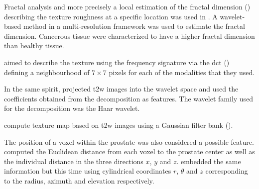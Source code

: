 \begin{enumerate}[leftmargin=*]

Fractal analysis and more precisely a local estimation of the fractal dimension (\cite{Benassi1998}) describing the texture roughness at a specific location was used in \cite{Lopes2011}. A wavelet-based method in a multi-resolution framework was used to estimate the fractal dimension. Cancerous tissue were characterized to have a higher fractal dimension than healthy tissue.

\cite{Chan2003} aimed to describe the texture using the frequency signature via the \acf{dct} (\cite{Ahmed1974}) defining a neighbourhood of $7 \times 7$ pixels for each of the modalities that they used.%
%
%

In the same spirit, \cite{Viswanath2012} projected \ac{t2w} images into the wavelet space and used the coefficients obtained from the decomposition as features. The wavelet family used for the decomposition was the Haar wavelet.

\cite{Litjens2014} compute texture map based on \ac{t2w} images using a Gaussian filter bank (\cite{Leung2001}).

The position of a voxel within the prostate was also considered a possible feature. \cite{Litjens2011,Litjens2014} computed the Euclidean distance from each voxel to the prostate center as well as the individual distance in the three directions $x$, $y$ and $z$. \cite{Chan2003} embedded the same information but this time using cylindrical coordinates $r$, $\theta$ and $z$ corresponding to the radius, azimuth and elevation respectively.


\end{enumerate}
